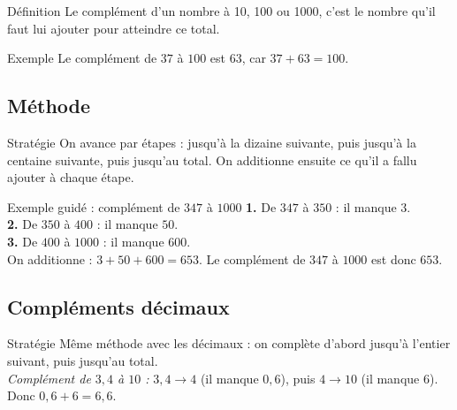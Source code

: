 \begin{regle}{Définition}
Le \textcolor{themeColor}{complément} d'un nombre à 10, 100 ou 1000, c'est le nombre qu'il faut lui ajouter pour atteindre ce total.
\end{regle}

\vspace{6pt}
\begin{astuce}{Exemple}
Le complément de $37$ à $100$ est $63$, car $37 + 63 = 100$.
\end{astuce}

\subsection{Méthode}

\begin{astuce}{Stratégie}
On avance par étapes : jusqu'à la dizaine suivante, puis jusqu'à la centaine suivante, puis jusqu'au total. On additionne ensuite ce qu'il a fallu ajouter à chaque étape.
\end{astuce}

\vspace{6pt}
\begin{astuce}{Exemple guidé : complément de $347$ à $1000$}
\textbf{1.} De $347$ à $350$ : il manque $3$.\\
\textbf{2.} De $350$ à $400$ : il manque $50$.\\
\textbf{3.} De $400$ à $1000$ : il manque $600$.\\[3pt]
On additionne : $3 + 50 + 600 = 653$. Le complément de $347$ à $1000$ est donc $653$.
\end{astuce}

\subsection{Compléments décimaux}

\begin{astuce}{Stratégie}
Même méthode avec les décimaux : on complète d'abord jusqu'à l'entier suivant, puis jusqu'au total.\\[3pt]
\textit{Complément de $3,4$ à $10$ :} $3,4 \to 4$ (il manque $0,6$), puis $4 \to 10$ (il manque $6$). Donc $0,6 + 6 = 6,6$.
\end{astuce}

